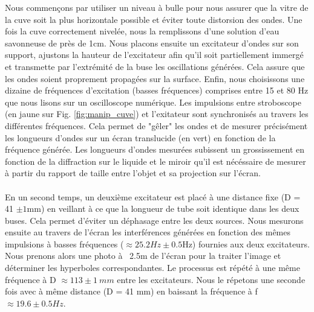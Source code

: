 Nous commençons par utiliser un niveau à bulle pour nous assurer que la vitre de la cuve soit la plus horizontale possible et éviter toute distorsion des ondes. Une fois la cuve correctement nivelée, nous la remplissons d'une solution d'eau savonneuse de près de 1cm. Nous placons ensuite un excitateur d’ondes sur son support, ajustons la hauteur de l’excitateur afin qu'il soit partiellement immergé et transmette par l'extrémité de la buse les oscillations générées. Cela assure que les ondes soient proprement propagées sur la surface. Enfin, nous choisissons une dizaine de fréquences d’excitation (basses fréquences) comprises entre 15 et 80 Hz que nous lisons sur un oscilloscope numérique. Les impulsions entre stroboscope (en jaune sur Fig. \ref{fig:manip_cuve}) et l'exitateur sont synchronisés au travers les différentes fréquences. Cela permet de "gêler" les ondes et de mesurer précisément les longueurs d’ondes sur un écran translucide (en vert) en fonction de la fréquence générée. Les longueurs d'ondes mesurées subissent un grossissement en fonction de la diffraction sur le liquide et le miroir qu'il est nécéssaire de mesurer à partir du rapport de taille entre l'objet et sa projection sur l'écran.
\\\\
En un second temps, un deuxième excitateur est placé à une distance fixe (D = 41 $\pm 1 $mm) en veillant à ce que la longueur de tube soit identique dans les deux buses. Cela permet d'éviter un déphasage entre les deux sources. Nous mesurons ensuite au travers de l'écran les interférences générées en fonction des mêmes impulsions à basses fréquences ($\approx 25.2Hz \pm 0.5 $Hz) fournies aux deux excitateurs. Nous prenons alors une photo à ~2.5m de l'écran pour la traiter l'image et déterminer les hyperboles correspondantes. Le processus est répété à une même fréquence à D $\approx 113 \pm 1~mm$ entre les excitateurs. Nous le répetons une seconde fois avec à même distance (D = 41 mm) en baissant la fréquence à f $\approx 19.6 \pm 0.5 Hz$.
